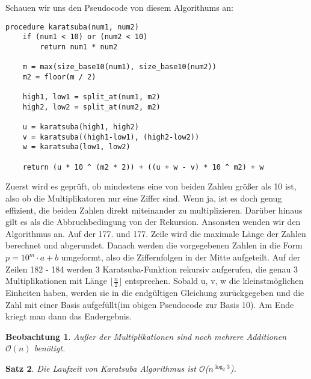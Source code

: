 \documentclass[11pt,a4paper, twoside]{article}
\newtheorem{theorem}{Satz}
\newtheorem{observation}[theorem]{Beobachtung}
\theoremstyle{definition}
\begin{document}
Schauen wir uns den Pseudocode \cite{1} von diesem Algorithums an:\\
\begin{lstlisting}
procedure karatsuba(num1, num2)
    if (num1 < 10) or (num2 < 10)
        return num1 * num2
    
    m = max(size_base10(num1), size_base10(num2))
    m2 = floor(m / 2) 
    
    high1, low1 = split_at(num1, m2)
    high2, low2 = split_at(num2, m2)
    
    u = karatsuba(high1, high2)
    v = karatsuba((high1-low1), (high2-low2))
    w = karatsuba(low1, low2)
    
    return (u * 10 ^ (m2 * 2)) + ((u + w - v) * 10 ^ m2) + w
\end{lstlisting}
Zuerst wird es geprüft, ob mindestens eine von beiden Zahlen größer als 10 ist, also ob die Multiplikatoren nur eine Ziffer sind. Wenn ja, ist es doch genug effizient, die beiden Zahlen direkt miteinander zu multiplizieren. Darüber hinaus gilt es als die Abbruchbedingung von der Rekursion. Ansonsten wenden wir den Algorithmus an. Auf der 177. und 177. Zeile wird die maximale Länge der Zahlen berechnet und abgerundet. Danach werden die vorgegebenen Zahlen in die Form $p = 10^{m} \cdot a + b$ umgeformt, also die Ziffernfolgen in der Mitte aufgeteilt. Auf der Zeilen 182 - 184 werden 3 Karatsuba-Funktion rekursiv aufgerufen, die genau 3 Multiplikationen mit Länge $\lfloor \frac{n}{2} \rfloor$ entsprechen. Sobald u, v, w die kleinstmöglichen Einheiten haben, werden sie in die endgültigen Gleichung zurückgegeben und die Zahl mit einer Basis aufgefüllt(im obigen Pseudocode zur Basis 10). Am Ende kriegt man dann das Endergebnis.

\begin{observation}
Außer der Multiplikationen sind noch mehrere Additionen $\mathcal{O}(n)$ benötigt.
\end{observation}

\begin{theorem}
Die Laufzeit von Karatsuba Algorithmus ist $\mathcal{O}$($n^{\log_{2}{3}}$).
\end{theorem}
\end{document}
